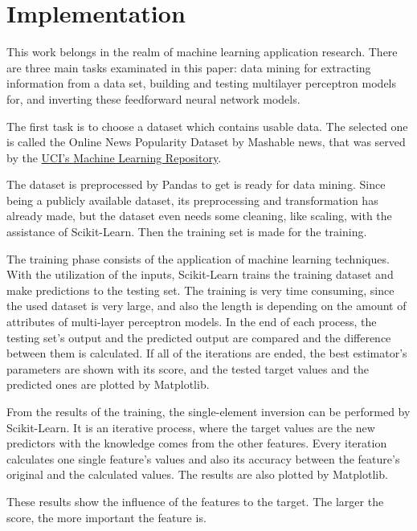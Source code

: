 \chapter{Implementation}

This work belongs in the realm of machine learning application research. There are three main tasks examinated in this paper: data mining for extracting information from a data set, building and testing multilayer perceptron models for, and inverting these feedforward neural network models. \medskip

The first task is to choose a dataset which contains usable data. The selected one is called the Online News Popularity Dataset by Mashable news, that was served by the  \href{http://archive.ics.uci.edu/ml/datasets/Online+News+Popularity}{UCI's Machine Learning Repository}. \smallskip

The dataset is preprocessed by Pandas to get is ready for data mining. Since being a publicly available dataset, its preprocessing and transformation has already made, but the dataset even needs some cleaning, like scaling, with the assistance of Scikit-Learn. Then the training set is made for the training.\smallskip

The training phase consists of the application of machine learning techniques. With the utilization of the inputs, Scikit-Learn trains the training dataset and make predictions to the testing set. The training is very time consuming, since the used dataset is very large, and also the length is depending on the amount of attributes of multi-layer perceptron models. In the end of each process, the testing set's output and the predicted output are compared and the difference between them is calculated. If all of the iterations are ended, the best estimator's parameters are shown with its score, and the tested target values and the predicted ones are plotted by Matplotlib.\smallskip

From the results of the training, the single-element inversion can be performed by Scikit-Learn. It is an iterative process, where the target values are the new predictors with the knowledge comes from the other features. Every iteration calculates one single feature's values and also its accuracy between the feature's original and the calculated values. The results are also plotted by Matplotlib. \smallskip

These results show the influence of the features to the target. The larger the score, the more important the feature is.



